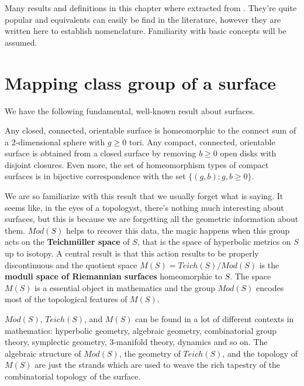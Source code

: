 Many results and definitions in this chapter where extracted from \cite[Farb]{Farb}. They're quite popular and equivalents can easily be find in the literature, however they are written here to establish nomenclature. Familiarity with basic concepts will be assumed.

\section{Mapping class group of a surface}

We have the following fundamental, well-known result about surfaces.

\begin{theorem}\label{CST}
Any closed, connected, orientable surface is homeomorphic to the connect sum of a 2-dimensional sphere with $g \geq 0$ tori. Any compact, connected, orientable surface is obtained from a closed surface by removing $b \geq 0 $ open disks with disjoint closures. Even more, the set of homeomorphism types of compact surfaces is in bijective correspondence with the set $\{ (g, b) : g, b \geq 0\}$.
\end{theorem}

We are so familiarize with this result that we usually forget what is saying. It seems like, in the eyes of a topologyst, there's nothing much interesting about surfaces, but this is because we are forgetting all the geometric information about them. $Mod(S)$ helps to recover this data, the magic happens when this group acts on the \textbf{Teichmüller space} of $S$, that is the space of hyperbolic metrics on $S$ up to isotopy. A central result is that this action results to be properly discontinuous and the quotient space $M(S) = Teich(S)/ Mod(S)$ is the \textbf{moduli space of Riemannian surfaces} homeomorphic to $S$. The space $M(S)$ is a essential object in mathematics and the group $Mod(S)$ encodes most of the topological features of $M(S)$.

$Mod(S)$, $Teich(S)$, and $M(S)$ can be found in a lot of different contexts in mathematics: hyperbolic geometry, algebraic geometry, combinatorial group theory, symplectic geometry, 3-manifold theory, dynamics and so on. The algebraic structure of $Mod(S)$, the geometry of $Teich(S)$, and the topology of $M(S)$ are just the strands which are used to weave the rich tapestry of the combinatorial topology of the surface.

